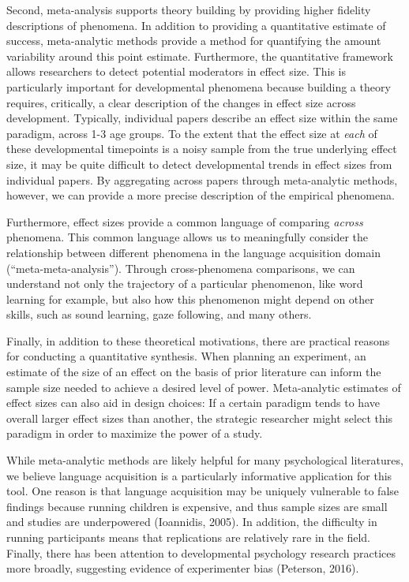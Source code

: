 \documentclass[english,floatsintext,man]{apa6}
\begin{document}
Second, meta-analysis supports theory building by providing higher
fidelity descriptions of phenomena. In addition to providing a
quantitative estimate of success, meta-analytic methods provide a method
for quantifying the amount variability around this point estimate.
Furthermore, the quantitative framework allows researchers to detect
potential moderators in effect size. This is particularly important for
developmental phenomena because building a theory requires, critically,
a clear description of the changes in effect size across development.
Typically, individual papers describe an effect size within the same
paradigm, across 1-3 age groups. To the extent that the effect size at
\emph{each} of these developmental timepoints is a noisy sample from the
true underlying effect size, it may be quite difficult to detect
developmental trends in effect sizes from individual papers. By
aggregating across papers through meta-analytic methods, however, we can
provide a more precise description of the empirical phenomena.

Furthermore, effect sizes provide a common language of comparing
\emph{across} phenomena. This common language allows us to meaningfully
consider the relationship between different phenomena in the language
acquisition domain (\enquote{meta-meta-analysis}). Through
cross-phenomena comparisons, we can understand not only the trajectory
of a particular phenomenon, like word learning for example, but also how
this phenomenon might depend on other skills, such as sound learning,
gaze following, and many others.

Finally, in addition to these theoretical motivations, there are
practical reasons for conducting a quantitative synthesis. When planning
an experiment, an estimate of the size of an effect on the basis of
prior literature can inform the sample size needed to achieve a desired
level of power. Meta-analytic estimates of effect sizes can also aid in
design choices: If a certain paradigm tends to have overall larger
effect sizes than another, the strategic researcher might select this
paradigm in order to maximize the power of a study.

While meta-analytic methods are likely helpful for many psychological
literatures, we believe language acquisition is a particularly
informative application for this tool. One reason is that language
acquisition may be uniquely vulnerable to false findings because running
children is expensive, and thus sample sizes are small and studies are
underpowered (Ioannidis, 2005). In addition, the difficulty in running
participants means that replications are relatively rare in the field.
Finally, there has been attention to developmental psychology research
practices more broadly, suggesting evidence of experimenter bias
(Peterson, 2016).
\end{document}
